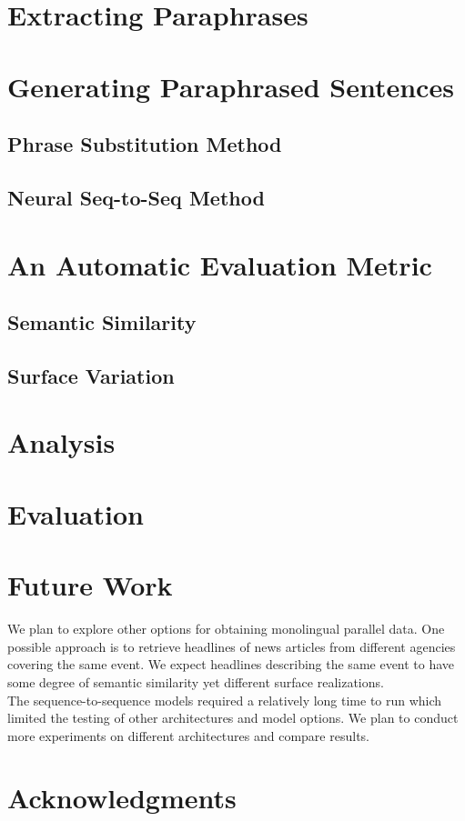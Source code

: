 \documentclass[11pt,letterpaper]{article}
\begin{document}
\section{Extracting Paraphrases}

\section{Generating Paraphrased Sentences}
\subsection{Phrase Substitution Method}
\subsection{Neural Seq-to-Seq Method}

\section{An Automatic Evaluation Metric}
\subsection{Semantic Similarity}
\subsection{Surface Variation}

\section{Analysis}

\section{Evaluation}

\section{Future Work}
 We plan to explore other options for obtaining monolingual parallel data. One possible approach is to retrieve headlines of news articles from different agencies covering the same event. We expect headlines describing the same event to have some degree of semantic similarity yet different surface realizations.\\
 The sequence-to-sequence models required a relatively long time to run which limited the testing of other architectures and model options. We plan to conduct more experiments on different architectures and compare results.  





\section*{Acknowledgments}



\end{document}
